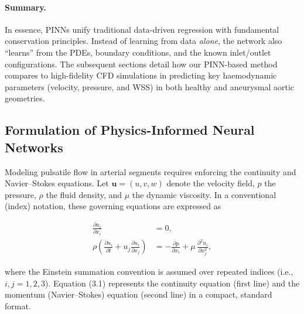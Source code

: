 \documentclass[12pt, a4paper]{article}
\begin{document}
\paragraph{Summary.}
In essence, PINNs unify traditional data-driven regression with fundamental
conservation principles. Instead of learning from data \emph{alone}, the
network also “learns” from the PDEs, boundary conditions, and the known
inlet/outlet configurations. The subsequent sections detail how our
PINN-based method compares to high-fidelity CFD simulations in predicting
key haemodynamic parameters (velocity, pressure, and WSS) in both healthy
and aneurysmal aortic geometries.


\subsection{Formulation of Physics-Informed Neural Networks}
\label{sec:PINN_Formulation}
Modeling pulsatile flow in arterial segments requires enforcing the continuity and Navier--Stokes equations. Let $\mathbf{u} = (u,v,w)$ denote the velocity field, $p$ the pressure, $\rho$ the fluid density, and $\mu$ the dynamic viscosity. In a conventional (index) notation, these governing equations are expressed as

\[
\begin{aligned}
\frac{\partial u_i}{\partial x_i} &= 0, \\
\rho\left(\frac{\partial u_i}{\partial t} + u_j \frac{\partial u_i}{\partial x_j}\right) &= -\frac{\partial p}{\partial x_i} + \mu\,\frac{\partial^2 u_i}{\partial x_j^2},
\end{aligned}
\tag{3.1}
\]

where the Einstein summation convention is assumed over repeated indices (i.e., \(i,j = 1,2,3\)). Equation (3.1) represents the continuity equation (first line) and the momentum (Navier–Stokes) equation (second line) in a compact, standard format.
\end{document}
